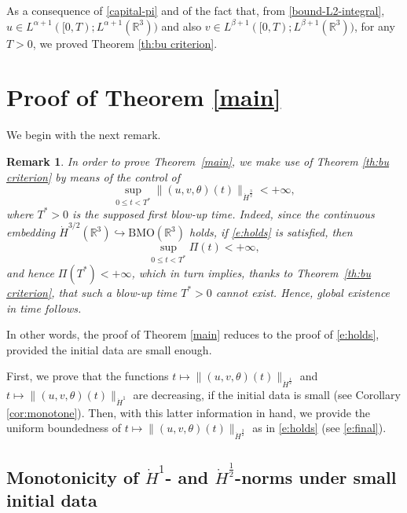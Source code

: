\documentclass[a4paper]{article}
\newtheorem{remark}[thm]{Remark}
\begin{document}
As a consequence of \eqref{capital-pi} and of the fact
that, from \eqref{bound-L2-integral}, 
$u\in L^{\alpha+1}([0,T); L^{\alpha+1}(\mathbb{R}^3))$ and also
$ v\in L^{\beta+1}([0,T); L^{\beta+1}(\mathbb{R}^3))$, for any $T>0$, 
we  proved Theorem \ref{th:bu criterion}.

\section{Proof of Theorem \ref{main}}
\label{sec:main}

We begin with the next remark.

\begin{remark} \label{rmk-Linfty-H3/2}
  In order to prove Theorem~\ref{main}, we make use of Theorem
  \ref{th:bu criterion} by means of the control of
  \begin{equation} \label{e:holds} \sup_{0\leq t<
      T^\ast}\|(u,v,\theta)(t)\|_{\dot H^{\frac32}} < +\infty,
  \end{equation}
  where $T^\ast>0$ is the supposed first blow-up time. Indeed, since
  the continuous embedding
  $\dot H^{3/2}(\mathbb{R}^3)\hookrightarrow
  \mathrm{BMO}(\mathbb{R}^3)$ holds, if \eqref{e:holds} is satisfied,
  then
  \begin{equation*}
    \sup_{0\leq t <T^\ast}\Pi(t)< +\infty,
  \end{equation*}
  and hence $\Pi(T^\ast) <+\infty$, which in turn implies, thanks to
  Theorem~\ref{th:bu criterion}, that such a blow-up time $T^\ast>0$
  cannot exist. Hence, global existence in time follows.
\end{remark}

In other words, the proof of Theorem \ref{main} reduces to the proof
of \eqref{e:holds}, provided the initial data are small enough.

First, we prove that the functions
$t \mapsto \|(u,v,\theta)(t)\|_{\dot H^{\frac12}}$ and
$t \mapsto \|(u,v,\theta)(t)\|_{\dot H^1}$ are decreasing, if the
initial data is small (see Corollary \ref{cor:monotone}). Then, with
this latter information in hand, we provide the uniform boundedness of
$t\mapsto \|(u,v,\theta)(t)\|_{\dot H^{\frac32}}$ as in
\eqref{e:holds} (see \eqref{e:final}).

\subsection{Monotonicity of $\dot H^{1}$- and $\dot H^{\frac12}$-norms under small initial data}
\end{document}
